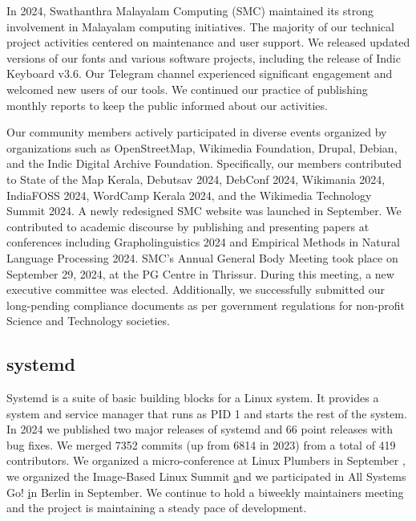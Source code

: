 \documentclass[a4paper]{report}
\begin{document}
In 2024, Swathanthra Malayalam Computing (SMC) maintained its strong involvement in Malayalam computing initiatives. The majority of our technical project activities centered on maintenance and user support. We released updated versions of our fonts and various software projects, including the release of Indic Keyboard v3.6. Our Telegram channel experienced significant engagement and welcomed new users of our tools. We continued our practice of publishing monthly reports to keep the public informed about our activities.

Our community members actively participated in diverse events organized by organizations such as OpenStreetMap, Wikimedia Foundation, Drupal, Debian, and the Indic Digital Archive Foundation. Specifically, our members contributed to State of the Map Kerala, Debutsav 2024, DebConf 2024, Wikimania 2024, IndiaFOSS 2024, WordCamp Kerala 2024, and the Wikimedia Technology Summit 2024. A newly redesigned SMC website was launched in September. We contributed to academic discourse by publishing and presenting papers at conferences including Grapholinguistics 2024 and Empirical Methods in Natural Language Processing 2024. SMC's Annual General Body Meeting took place on September 29, 2024, at the PG Centre in Thrissur. During this meeting, a new executive committee was elected. Additionally, we successfully submitted our long-pending compliance documents as per government regulations for non-profit Science and Technology societies.

\subsection{systemd}

Systemd is a suite of basic building blocks for a Linux system. It provides a system and service manager that runs as PID 1 and starts the rest of the system. In 2024 we published two major releases of systemd and 66 point releases with bug fixes. We merged 7352 commits (up from 6814 in 2023) from a total of 419 contributors. We organized a micro-conference at Linux Plumbers in September \href{https://lpc.events/event/18/sessions/206/#20240919}, we organized the Image-Based Linux Summit \href{https://uapi-group.org/docs/minutes/2024-09-24__image-based-linux-summit/} and we participated in All Systems Go! \href{https://cfp.all-systems-go.io/all-systems-go-2024/schedule/} in Berlin in September. We continue to hold a biweekly maintainers meeting and the project is maintaining a steady pace of development.
\end{document}
